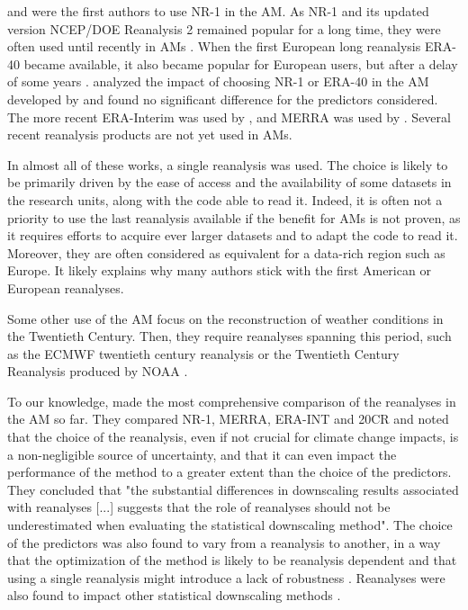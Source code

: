 \documentclass{ametsoc}
\begin{document}
\citet{Timbal2003} and \citet{Bontron2004} were the first authors to use NR-1 in the AM. As NR-1 and its updated version NCEP/DOE Reanalysis 2 \citep[NR-2,][]{Kanamitsu2002} remained popular for a long time, they were often used until recently in AMs \citep{Wetterhall2005a, Gangopadhyay2005, Altava-Ortiz2006, Barrera2007, Cannon2007, Matulla2007, Bliefernicht2007, Maurer2008, Wu2012, Marty2012, Teng2012, Horton2012, Yiou2014}. When the first European long reanalysis ERA-40 \citep{Uppala2005} became available, it also became popular for European users, but after a delay of some years \citep {Willems2011b, JakobThemessl2011a, BenDaoud2011, Turco2011a, Franke2011, Pascual2012b, Schenk2012, Ribalaygua2013a, Osca2013, Radanovics2013, Martin2014b, Chardon2014, BenDaoud2016}. \citet{BenDaoud2009} analyzed the impact of choosing NR-1 or ERA-40 in the AM developed by \citet{Bontron2004} and found no significant difference for the predictors considered. The more recent ERA-Interim \citep[ERA-INT, ][]{Dee2011a} was used by \cite{Raynaud2016b}, and MERRA \citep{Rienecker2011} was used by \citet{Vanvyve2015}. Several recent reanalysis products are not yet used in AMs.

In almost all of these works, a single reanalysis was used. The choice is likely to be primarily driven by the ease of access and the availability of some datasets in the research units, along with the code able to read it. Indeed, it is often not a priority to use the last reanalysis available if the benefit for AMs is not proven, as it requires efforts to acquire ever larger datasets and to adapt the code to read it. Moreover, they are often considered as equivalent for a data-rich region such as Europe. It likely explains why many authors stick with the first American or European reanalyses.

Some other use of the AM focus on the reconstruction of weather conditions in the Twentieth Century. Then, they require reanalyses spanning this period, such as the ECMWF twentieth century reanalysis \citep[ERA-20C, ][]{Poli2016} or the Twentieth Century Reanalysis \citep[20CR][]{Compo2011} produced by NOAA \citep[for example,][]{Kuentz2015, Caillouet2016, Brigode2016, Bonnet2017}. 

To our knowledge, \citet{Dayon2015} made the most comprehensive comparison of the reanalyses in the AM so far. They compared NR-1, MERRA, ERA-INT and 20CR and noted that the choice of the reanalysis, even if not crucial for climate change impacts, is a non-negligible source of uncertainty, and that it can even impact the performance of the method to a greater extent than the choice of the predictors. They concluded that "the substantial differences in downscaling results associated with reanalyses [...] suggests that the role of reanalyses should not be underestimated when evaluating the statistical downscaling method". The choice of the predictors was also found to vary from a reanalysis to another, in a way that the optimization of the method is likely to be reanalysis dependent and that using a single reanalysis might introduce a lack of robustness \citep{Dayon2015}. Reanalyses were also found to impact other statistical downscaling methods \citep[e.g.][]{Koukidis2009}.
\end{document}
